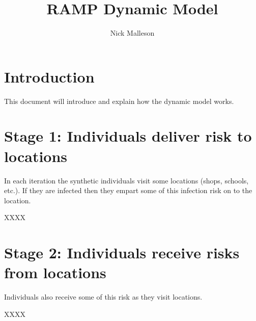 \documentclass{article}
\title{RAMP Dynamic Model}
\author{Nick Malleson}
\date{}
\begin{document}
\maketitle
\tableofcontents

\newpage

\section{Introduction}

This document will introduce and explain how the dynamic model works.

\section{Stage 1: Individuals deliver risk to locations}

In each iteration the synthetic individuals visit some locations (shops, schools, etc.).
If they are infected then they empart some of this infection risk on to the location.

XXXX



\section{Stage 2: Individuals receive risks from locations}

Individuals also receive some of this risk as they visit locations.

XXXX




\end{document}
